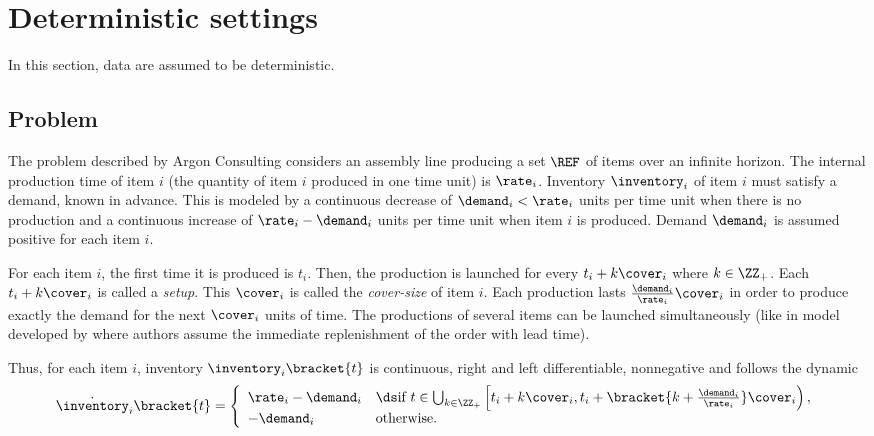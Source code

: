 \section{Deterministic settings}
\label{sec:lot-size:single-line:deterministic}

In this section, data are assumed to be deterministic.


\subsection{Problem}
\label{sec:lot-size:single-line:deterministic:problems}

The problem described by Argon Consulting considers an assembly line producing a set $\REF$ of items over an infinite horizon.
The internal production time of item $i$ (\ie the quantity of item $i$ produced in one time unit) is $\rate_i$.
Inventory $\inventory_i$ of item $i$ must satisfy a demand, known in advance.
This is modeled by a continuous decrease of $\demand_i<\rate_i$ units per time unit when there is no production and a continuous increase of $\rate_i-\demand_i$ units per time unit when item $i$ is produced.
Demand $\demand_i$ is assumed positive for each item $i$.


For each item $i$, the first time it is produced is $t_i$.
Then, the production is launched for every $t_i+k\cover_i$ where $k\in\ZZ_+$.
Each $t_i+k\cover_i$ is called a \emph{setup}.
This $\cover_i$ is called the \emph{cover-size} of item $i$.
Each production lasts $\frac{\demand_i}{\rate_i}\cover_i$ in order to produce exactly the demand for the next $\cover_i$ units of time.
The productions of several items can be launched simultaneously (like in model developed by \citet{Ohno2001} where authors assume the immediate replenishment of the order with lead time).


Thus, for each item $i$, inventory $\inventory_i\bracket{t}$ is continuous, right and left differentiable, nonnegative and follows the dynamic
\begin{equation}\label{eq:lot-size:single-line:deterministic:motivations:dynamic}
  \dot{\inventory}_i\bracket{t} =
  \left\{
  \begin{array}{ll}
  \rate_i-\demand_i
  & \ds\mbox{if}\ t\in\bigcup_{k\in\ZZ_+} \left[t_i+k\cover_i,t_i+\bracket{k+\frac{\demand_i}{\rate_i}}\cover_i\right),
  \\
  -\demand_i
  & \mbox{otherwise}.
  \end{array}
  \right.
\end{equation}


